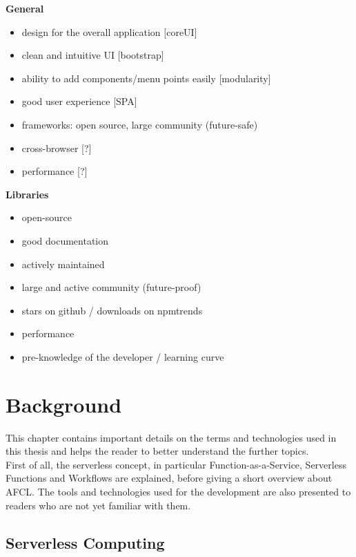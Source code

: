 \documentclass[a4paper,12pt,pdftex,halfparskip,cleardoubleempty,bibtotoc,liststotoc]{scrbook}
\begin{document}
\textbf{General}
\begin{itemize}
	\item design for the overall application [coreUI]
	\item clean and intuitive UI [bootstrap]
	\item ability to add components/menu points easily [modularity]
	\item good user experience [SPA]
	\item frameworks: open source, large community (future-safe)
	\item cross-browser [?]
	\item performance [?]
\end{itemize}
\textbf{Libraries}
\begin{itemize}
	\item open-source
	\item good documentation
	\item actively maintained
	\item large and active community (future-proof)
	\item stars on github / downloads on npmtrends
	\item performance
	\item pre-knowledge of the developer / learning curve
\end{itemize}



\chapter{Background}

This chapter contains important details on the terms and technologies used in this thesis and helps the reader to better understand the further topics.\\
First of all, the serverless concept, in particular Function-as-a-Service, Serverless Functions and Workflows are explained, before giving a short overview about AFCL. The tools and technologies used for the development are also presented to readers who are not yet familiar with them.

\section{Serverless Computing}
\end{document}
